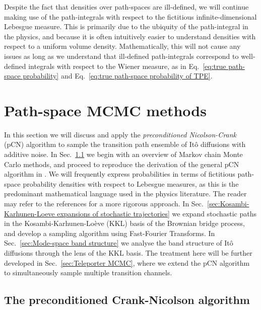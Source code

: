 Despite the fact that densities over path-spaces are ill-defined, we will continue making use of the path-integrals with respect to the fictitious infinite-dimensional Lebesgue measure. This is primarily due to the ubiquity of the path-integral in the physics, and because it is often intuitively easier to understand densities with respect to a uniform volume density. Mathematically, this will not cause any issues as long as we understand that ill-defined path-integrals correspond to well-defined integrals with respect to the Wiener measure, as in Eq.~\ref{eq:true path-space probability} and Eq.~\ref{eq:true path-space probability of TPE}.

\section{Path-space MCMC methods} \label{sec:Path-space MCMC}

In this section we will discuss and apply the \textit{preconditioned Nicolson-Crank} (pCN) algorithm to sample the transition path ensemble of It\^{o} diffusions with additive noise. In Sec.~\ref{sec:The preconditioned Crank-Nicolson algorithm} we begin with an overview of Markov chain Monte Carlo methods, and proceed to reproduce the derivation of the general pCN algorithm in \citep{cotterMCMCMethodsFunctions2013, beskosMCMCMETHODSDIFFUSION2008, hairerAnalysisSPDEsArising2005, hairerAnalysisSPDEsArising2007, hairerSpectralGapsMetropolis2014}. We will frequently express probabilities in terms of fictitious path-space probability densities with respect to Lebesgue measures, as this is the predominant mathematical language used in the physics literature. The reader may refer to the references for a more rigorous approach. In Sec.~\ref{sec:Kosambi-Karhunen-Loeve expansions of stochastic trajectories} we expand stochastic paths in the Kosambi-Karhunen-Lo\`eve (KKL) basis of the Brownian bridge process, and develop a sampling algorithm using Fast-Fourier Transforms. In Sec.~\ref{sec:Mode-space band structure} we analyse the band structure of It\^{o} diffusions through the lens of the KKL basis. The treatment here will be further developed in Sec.~\ref{sec:Teleporter MCMC}, where we extend the pCN algorithm to simultaneously sample multiple transition channels.

\subsection{The preconditioned Crank-Nicolson algorithm} \label{sec:The preconditioned Crank-Nicolson algorithm}
 
